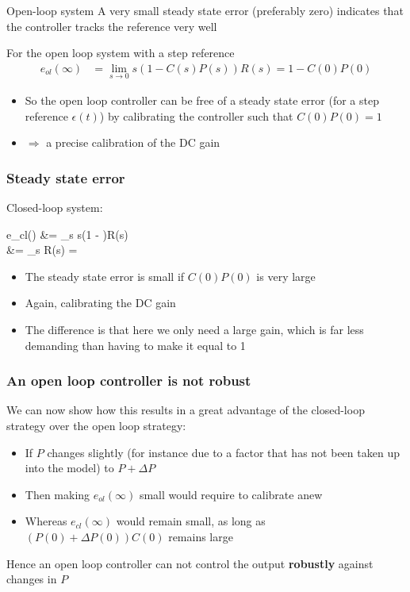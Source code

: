 \begin{frame}
	\begin{block}{Open-loop system}
		A very small steady state error (preferably zero) indicates that the controller tracks the reference very well
		
		For the open loop system with a step reference
		\begin{align*}
			e_{ol}(\infty) &= \lim\limits_{s \rightarrow 0}
			s(1 - C(s)P(s))R(s) = 1 - C(0)P(0)
		\end{align*}
		\vspace{-1em}
		\begin{itemize}
			\item So the open loop controller can be free of a steady state error (for a step reference $\epsilon(t)$) by calibrating the controller such that $C(0)P(0)=1$
			\item $\Rightarrow$ a precise calibration of the DC gain
		\end{itemize}
	\end{block}
\end{frame}


\begin{frame}
	\frametitle{Steady state error}
	\begin{block}{Closed-loop system:}
		\begin{flalign*}
			e_{cl}(\infty) &= \lim\limits_{s } s\left(1 - \right)R(s) \\
			&= \lim\limits_{s } R(s) = 
		\end{flalign*}
		\begin{itemize}
			\item The steady state error is small if $C(0)P(0)$ is very large
			\item Again, calibrating the DC gain
			\item The difference is that here we only need a large gain, which is far less demanding than having to make it equal to 1
		\end{itemize}
	\end{block}
\end{frame}

\begin{frame}
	\frametitle{An open loop controller is not robust}
	\begin{block}{}
		We can now show how this results in a great advantage of the closed-loop strategy over the open loop strategy:
		\begin{itemize}
			\item If $P$ changes slightly (for instance due to a factor that has not been taken up into the model) to $P+\Delta P$
			\item Then making $e_{ol}(\infty)$ small would require to calibrate anew
			\item Whereas $e_{cl} (\infty)$ would remain small, as long as $(P(0)+\Delta P(0))C(0)$ remains large
			
		\end{itemize}
		Hence an open loop controller can not control the output \textbf{robustly} against changes in $P$
	\end{block}
\end{frame}

